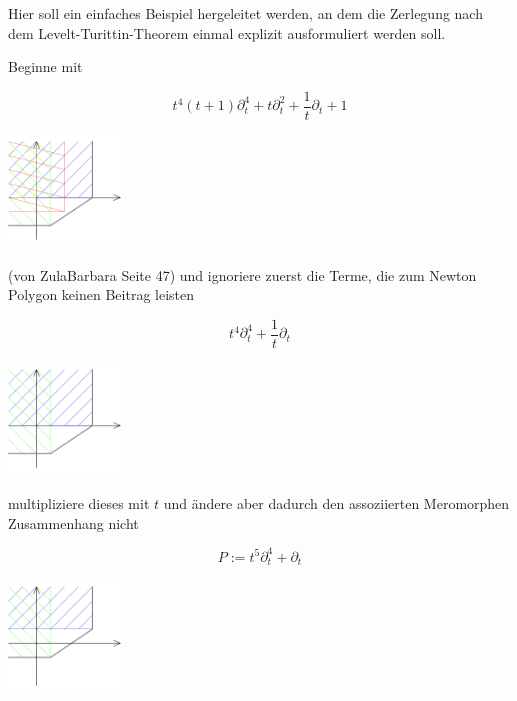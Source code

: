 
Hier soll ein einfaches Beispiel hergeleitet werden, an dem die Zerlegung nach
dem Levelt-Turittin-Theorem einmal explizit ausformuliert werden soll.

Beginne mit

\begin{minipage}[hbt]{0,49\textwidth}
  \[ t^4(t+1)\partial_t^4 + t\partial_t^2+\frac{1}{t}\partial_t+1 \]
\end{minipage}
\begin{minipage}[hbt]{0,49\textwidth}
  \begin{center}
    \includegraphics[width=3cm]{img/e.png}
  \end{center}
\end{minipage}

(von ZulaBarbara Seite 47)
und ignoriere zuerst die Terme, die zum Newton Polygon keinen Beitrag leisten

\begin{minipage}[hbt]{0,49\textwidth}
  \[ t^4\partial_t^4 +\frac{1}{t}\partial_t \]
\end{minipage}
\begin{minipage}[hbt]{0,49\textwidth}
  \begin{center}
    \includegraphics[width=3cm]{img/bar_e.png}
  \end{center}
\end{minipage}

multipliziere dieses mit $t$ und ändere aber dadurch den assoziierten
Meromorphen Zusammenhang nicht \cite[Chapter 5.1]{sabbah_cimpa90}

\begin{minipage}[hbt]{0,49\textwidth}
  \[ P:=t^5\partial_t^4 +\partial_t \]
\end{minipage}
\begin{minipage}[hbt]{0,49\textwidth}
  \begin{center} 
    \includegraphics[width=3cm]{img/bar_e_times_x.png} 
  \end{center}
\end{minipage}

